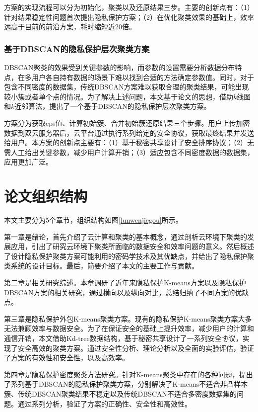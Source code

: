 方案的实现流程可以分为初始化，聚类以及还原结果三步。主要的创新点有：（1）针对结果稳定性问题首次提出隐私保护方案；（2）在优化聚类效果的基础上，效率远高于目前的前沿方案\cite{bozdemir2021privacy}，耗时缩短近20倍。

\subsubsection{基于DBSCAN的隐私保护层次聚类方案}
DBSCAN聚类的效果受到关键参数的影响，而参数的设置需要分析数据分布特点，在多用户各自持有数据的场景下难以找到合适的方法确定参数值。同时，对于包含不同密度的数据集，传统DBSCAN方案难以获取合理的聚类结果，可能出现较小簇或者单个点的情况。为了解决上述问题，本文基于论文\cite{latifi2021dbhc}的思想，借助$ k $线图和$ k $近邻算法，提出了一个基于DBSCAN的隐私保护层次聚类方案。

方案分为获取eps值、计算初始簇、合并初始簇还原结果三个步骤。用户上传加密数据到双云服务器后，云平台通过执行系列给定的安全协议，获取最终结果并发送给用户。本方案的创新点主要有：（1）基于秘密共享设计了安全排序协议；（2）无需人工给出关键参数，减少用户计算开销；（3）适应包含不同密度数据的数据集，应用更加广泛。

\section{论文组织结构}

本文主要分为5个章节，组织结构如图\ref{lunwenjiegou}所示。

第一章是绪论，首先介绍了云计算和聚类的基本概念，通过剖析云环境下聚类的发展应用，引出了研究云环境下聚类所面临的数据安全和效率问题的意义。然后概述了设计隐私保护聚类方案可能利用的密码学技术及其优缺点，并给出了隐私保护聚类系统的设计目标。最后，简要介绍了本文的主要工作与贡献。

第二章是相关研究综述。本章调研了近年来隐私保护K-means方案以及隐私保护DBSCAN方案的相关研究，通过横向以及纵向对比，总结归纳了不同方案的优缺点。

第三章是隐私保护外包K-means聚类方案。现有的隐私保护K-means聚类方案大多无法兼顾效率与数据安全。为了在保证安全的基础上提升效率，减少用户的计算和通信开销，本文借助Kd-tree数据结构，基于秘密共享设计了一系列安全协议，实现了安全高效的聚类方案。通过安全性分析、理论分析以及全面的实验评估，验证了方案的有效性和安全性，以及高效率。

第四章是隐私保护密度聚类方法研究。针对K-means聚类中存在的各种问题，提出了系列基于DBSCAN的隐私保护聚类方案，分别解决了K-means不适合非凸样本簇、传统DBSCAN聚类结果不稳定以及传统DBSCAN不适合多密度数据集的问题。通过系列分析，验证了方案的正确性、安全性和高效性。

